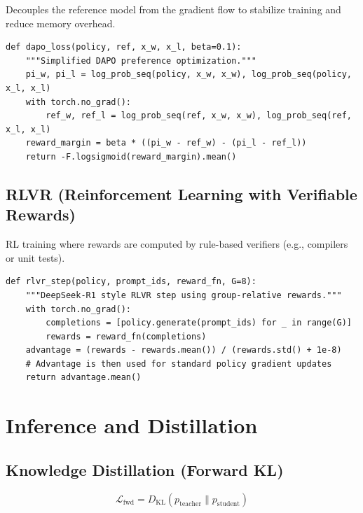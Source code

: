 Decouples the reference model from the gradient flow to stabilize training and reduce memory overhead.

\begin{lstlisting}[style=pythonstyle, caption={DAPO loss function}, label=lst:dapo]
def dapo_loss(policy, ref, x_w, x_l, beta=0.1):
    """Simplified DAPO preference optimization."""
    pi_w, pi_l = log_prob_seq(policy, x_w, x_w), log_prob_seq(policy, x_l, x_l)
    with torch.no_grad():
        ref_w, ref_l = log_prob_seq(ref, x_w, x_w), log_prob_seq(ref, x_l, x_l)
    reward_margin = beta * ((pi_w - ref_w) - (pi_l - ref_l))
    return -F.logsigmoid(reward_margin).mean()
\end{lstlisting}

\subsection{RLVR (Reinforcement Learning with Verifiable Rewards)}
\label{form:rlvr}

RL training where rewards are computed by rule-based verifiers (e.g., compilers or unit tests).

\begin{lstlisting}[style=pythonstyle, caption={RLVR update step}, label=lst:rlvr]
def rlvr_step(policy, prompt_ids, reward_fn, G=8):
    """DeepSeek-R1 style RLVR step using group-relative rewards."""
    with torch.no_grad():
        completions = [policy.generate(prompt_ids) for _ in range(G)]
        rewards = reward_fn(completions)
    advantage = (rewards - rewards.mean()) / (rewards.std() + 1e-8)
    # Advantage is then used for standard policy gradient updates
    return advantage.mean()
\end{lstlisting}

\section{Inference and Distillation}
\label{app:inference_distill}
\label{app:distill}

\subsection{Knowledge Distillation (Forward KL)}
\label{form:fwd_kd}

\[
  \mathcal{L}_\mathrm{fwd} = D_\mathrm{KL}(p_\mathrm{teacher} \| p_\mathrm{student})
\]

